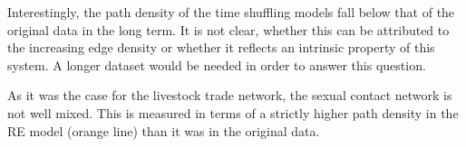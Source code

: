 Interestingly, the path density of the time shuffling models fall below that of the original data in the long term.
It is not clear, whether this can be attributed to the increasing edge density or whether it reflects an intrinsic property of this system.
A longer dataset would be needed in order to answer this question. 

As it was the case for the livestock trade network, the sexual contact network is not well mixed.
This is measured in terms of a strictly higher path density in the RE model (orange line) than it was in the original data.

